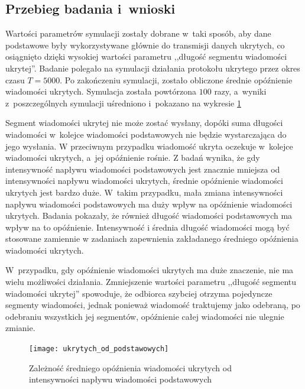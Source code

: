 \documentclass[a4paper, twoside, 12pt]{report}
\begin{document}
        \subsection{Przebieg badania i~wnioski}
            Wartości parametrów symulacji zostały dobrane w~taki sposób, aby dane podstawowe
            były wykorzystywane głównie do transmisji danych ukrytych, co osiągnięto
            dzięki wysokiej wartości parametru ,,długość segmentu wiadomości ukrytej''.
            Badanie polegało na symulacji działania protokołu ukrytego przez okres czasu
            \( T = 5000 \). Po zakończeniu symulacji, zostało obliczone
            średnie opóźnienie wiadomości ukrytych.
            Symulacja została powtórzona \( 100 \) razy, a~wyniki z~poszczególnych
            symulacji uśredniono i~pokazano na wykresie \ref{OPOZNIENIEUKRYTYCHODPODSTAWOWYCH}

            Segment wiadomości ukrytej nie może zostać wysłany, dopóki suma długości
            wiadomości w~kolejce wiadomości podstawowych nie będzie wystarczająca do jego wysłania.
            W przeciwnym przypadku wiadomość ukryta oczekuje w~kolejce wiadomości
            ukrytych, a~jej opóźnienie rośnie. Z badań wynika, że gdy intensywność
            napływu wiadomości podstawowych jest znacznie mniejsza od intensywności
            napływu wiadomości ukrytych, średnie opóźnienie wiadomości ukrytych jest
            bardzo duże. W~takim przypadku, mała zmiana intensywności napływu wiadomości
            podstawowych ma duży wpływ na opóźnienie wiadomości ukrytych. Badania
            pokazały, że również długość wiadomości podstawowych ma wpływ na to opóźnienie.
            Intensywność i średnia długość wiadomości mogą być stosowane zamiennie
            w zadaniach zapewnienia zakładanego średniego opóźnienia wiadomości ukrytych.

            W~przypadku, gdy opóźnienie wiadomości ukrytych ma duże znaczenie,
            nie ma wielu możliwości działania. Zmniejszenie wartości parametru ,,długość
            segmentu wiadomości ukrytej'' spowoduje, że odbiorca szybciej otrzyma
            pojedyncze segmenty wiadomości, jednak ponieważ wiadomość traktujemy jako odebraną,
            po odebraniu wszystkich jej segmentów, opóźnienie całej wiadomości
            nie ulegnie zmianie.

        \begin{figure}[h]
                \centering
                \texttt{[image: ukrytych\_od\_podstawowych]}
                \caption{Zależność średniego opóźnienia wiadomości ukrytych od
                    intensywności napływu wiadomości podstawowych}
                \label{OPOZNIENIEUKRYTYCHODPODSTAWOWYCH}
        \end{figure}
\end{document}
